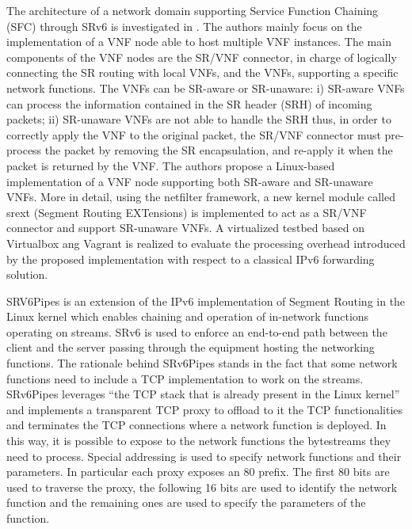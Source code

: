 The architecture of a network domain supporting Service Function Chaining (SFC) through SRv6 is investigated in \cite{17-vnf-chaining-sr}.
The authors mainly focus on the implementation of a VNF node able to host multiple VNF instances. The main components of the VNF nodes are the SR/VNF connector, in charge of logically connecting the SR routing with local VNFs, and the VNFs, supporting a specific network functions. The VNFs can be SR-aware or SR-unaware: i) SR-aware VNFs can process the
information contained in the SR header (SRH) of incoming packets; ii) SR-unaware VNFs are not able to handle the SRH thus, in order to correctly apply the VNF to the original packet, the SR/VNF connector must pre-process the packet by removing the SR encapsulation, and re-apply it when the packet is returned by the VNF.
The authors propose a Linux-based implementation of a VNF node supporting both SR-aware and SR-unaware VNFs. More in detail, using the netfilter framework, a new kernel module called srext (Segment Routing EXTensions) is implemented to act as a SR/VNF connector and support SR-unaware VNFs.
A virtualized testbed based on Virtualbox ang Vagrant is realized to evaluate the processing overhead introduced by the proposed implementation with respect to a classical IPv6 forwarding solution. %

SRV6Pipes \cite{duchene2018srv6pipes} is an extension of the IPv6 implementation of Segment Routing in the Linux kernel which enables chaining and operation of in-network functions operating on streams. SRv6 is used to enforce an end-to-end path between the client and the server passing through the equipment hosting the networking functions. 
The rationale behind SRv6Pipes stands in the fact that some network functions need to include a TCP implementation to work on the streams. SRv6Pipes leverages ``the TCP stack that is already present in the Linux kernel'' and implements a transparent TCP proxy to offload to it the TCP functionalities and terminates the TCP connections where a network function is deployed. In this way, it is possible to expose to the network functions the bytestreams they need to process. Special addressing is used to specify network functions and their parameters. In particular each proxy exposes an 80 prefix. The first 80 bits are used to traverse the proxy, the following 16 bits are used to identify the network function and the remaining ones are used to specify the parameters of the function. %

